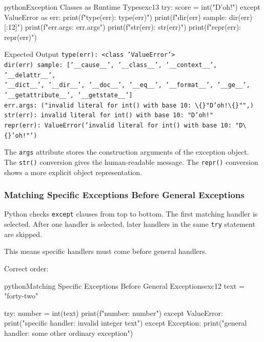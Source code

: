 \begin{codebox}[]{python}{Exception Classes as Runtime Types}{exc13}
try:
    score = int("D'oh!")
except ValueError as err:
    print(f"type(err): {type(err)}")
    print(f"dir(err) sample: {dir(err)[:12]}")
    print(f"err.args: {err.args}")
    print(f"str(err): {str(err)}")
    print(f"repr(err): {repr(err)}")
\end{codebox}


\begin{iobox}{Expected Output}
\texttt{type(err): <class 'ValueError'>} \\
\texttt{dir(err) sample: ['\_\_cause\_\_', '\_\_class\_\_', '\_\_context\_\_', '\_\_delattr\_\_',} \\
\texttt{'\_\_dict\_\_', '\_\_dir\_\_', '\_\_doc\_\_', '\_\_eq\_\_', '\_\_format\_\_', '\_\_ge\_\_',} \\
\texttt{'\_\_getattribute\_\_', '\_\_getstate\_\_']} \\
\texttt{err.args: ("invalid literal for int() with base 10: \textbackslash\{\}"D'oh!\textbackslash\{\}"",)} \\
\texttt{str(err): invalid literal for int() with base 10: "D'oh!"} \\
\texttt{repr(err): ValueError('invalid literal for int() with base 10: "D\textbackslash\{\}'oh!"')} \\
\end{iobox}


The \texttt{args} attribute stores the construction arguments of the exception object. The \texttt{str()} conversion gives the human-readable message. The \texttt{repr()} conversion shows a more explicit object representation.

\subsubsection{Matching Specific Exceptions Before General Exceptions}

Python checks \texttt{except} clauses from top to bottom. The first matching handler is selected. After one handler is selected, later handlers in the same \texttt{try} statement are skipped.

This means specific handlers must come before general handlers.

Correct order:

\begin{codebox}[]{python}{Matching Specific Exceptions Before General Exceptions}{exc12}
text = "forty-two"

try:
    number = int(text)
    print(f"number: {number}")
except ValueError:
    print("specific handler: invalid integer text")
except Exception:
    print("general handler: some other ordinary exception")
\end{codebox}


